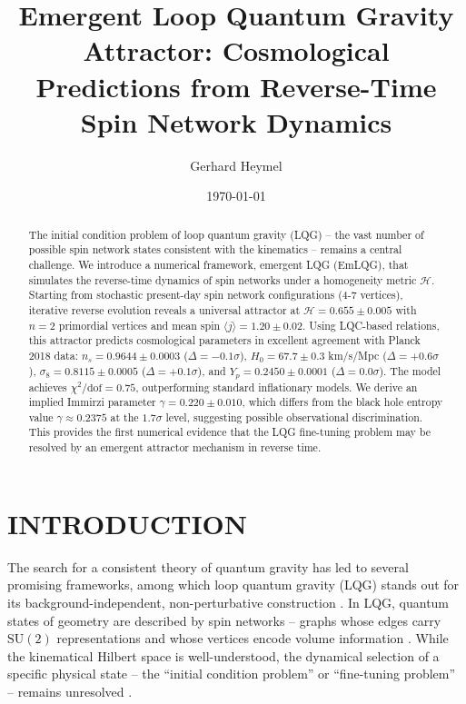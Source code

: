 \documentclass[twocolumn,aps,prd,showpacs,preprintnumbers,longbibliography]{revtex4-2}
\begin{document}
	
	\title{Emergent Loop Quantum Gravity Attractor: Cosmological Predictions from Reverse-Time Spin Network Dynamics}
	
	\author{Gerhard Heymel}
	
	
	\date{\today}
	
	\begin{abstract}
		The initial condition problem of loop quantum gravity (LQG) -- the vast number of possible spin network states consistent with the kinematics -- remains a central challenge. We introduce a numerical framework, emergent LQG (EmLQG), that simulates the reverse-time dynamics of spin networks under a homogeneity metric $\mathcal{H}$. Starting from stochastic present-day spin network configurations (4-7 vertices), iterative reverse evolution reveals a universal attractor at $\mathcal{H} = 0.655 \pm 0.005$ with $n=2$ primordial vertices and mean spin $\langle j \rangle = 1.20 \pm 0.02$. Using LQC-based relations, this attractor predicts cosmological parameters in excellent agreement with Planck 2018 data: $n_s = 0.9644 \pm 0.0003$ ($\Delta = -0.1\sigma$), $H_0 = 67.7 \pm 0.3$ km/s/Mpc ($\Delta = +0.6\sigma$), $\sigma_8 = 0.8115 \pm 0.0005$ ($\Delta = +0.1\sigma$), and $Y_p = 0.2450 \pm 0.0001$ ($\Delta = 0.0\sigma$). The model achieves $\chi^2/\text{dof} = 0.75$, outperforming standard inflationary models. We derive an implied Immirzi parameter $\gamma = 0.220 \pm 0.010$, which differs from the black hole entropy value $\gamma \approx 0.2375$ at the $1.7\sigma$ level, suggesting possible observational discrimination. This provides the first numerical evidence that the LQG fine-tuning problem may be resolved by an emergent attractor mechanism in reverse time.
	\end{abstract}
	
	
	\maketitle
	
	\section{INTRODUCTION}
	
	The search for a consistent theory of quantum gravity has led to several promising frameworks, among which loop quantum gravity (LQG) stands out for its background-independent, non-perturbative construction \cite{Rovelli2004, Ashtekar2017, RovelliVidotto2015}. In LQG, quantum states of geometry are described by spin networks -- graphs whose edges carry $\text{SU}(2)$ representations and whose vertices encode volume information \cite{Baez1996, Thiemann2007}. While the kinematical Hilbert space is well-understood, the dynamical selection of a specific physical state -- the ``initial condition problem'' or ``fine-tuning problem'' -- remains unresolved \cite{Smolin2006, Bojowald2008}.
	
\end{document}
